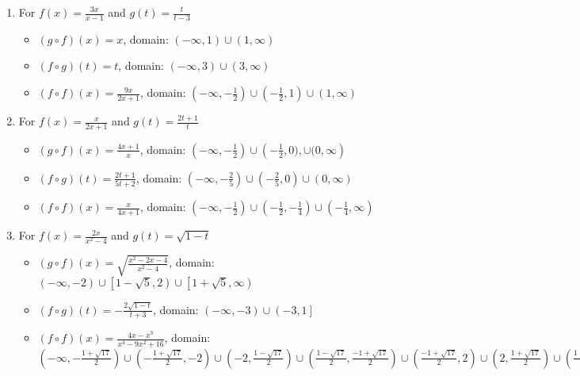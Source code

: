 \begin{enumerate}
\begin{itemize}
\end{itemize}


\item For   $f(x) = \frac{3x}{x-1}$ and $g(t) =\frac{t}{t-3}$

\begin{itemize}

\item  $(g \circ f)(x) =x$, domain: $\left(-\infty, 1\right) \cup (1, \infty)$

\item  $(f \circ g)(t) =t$, domain:  $\left(-\infty, 3\right) \cup (3,\infty)$

\item  $(f \circ f)(x) = \frac{9x}{2x+1}$, domain: $\left(-\infty, -\frac{1}{2}\right) \cup \left(-\frac{1}{2}, 1 \right) \cup \left(1,\infty \right)$

\end{itemize}


\item For    $f(x) = \frac{x}{2x+1}$ and $g(t) = \frac{2t+1}{t}$

\begin{itemize}

\item  $(g \circ f)(x) = \frac{4x+1}{x}$, domain: $\left(-\infty, -\frac{1}{2}\right) \cup \left(-\frac{1}{2}, 0), \cup (0, \infty\right)$

\item  $(f \circ g)(t) = \frac{2t+1}{5t+2}$, domain:  $\left(-\infty, -\frac{2}{5}\right) \cup \left(-\frac{2}{5}, 0\right) \cup (0,\infty)$

\item  $(f \circ f)(x) = \frac{x}{4x+1}$, domain: $\left(-\infty, -\frac{1}{2}\right) \cup \left(-\frac{1}{2}, -\frac{1}{4} \right) \cup \left(-\frac{1}{4},\infty\right)$

\end{itemize}


\item For  $f(x) = \frac{2x}{x^2-4}$ and $g(t) =\sqrt{1-t}$ 

\begin{itemize}

\item  $(g \circ f)(x) =\sqrt{\frac{x^2-2x-4}{x^2-4}}$, domain: $\left(-\infty, -2\right) \cup \left[1-\sqrt{5}, 2\right) \cup \left[1+\sqrt{5}, \infty\right)$

\item  $(f \circ g)(t) = -\frac{2\sqrt{1-t}}{t+3}$, domain: $\left(-\infty, -3\right) \cup \left(-3, 1\right]$

\item  $(f \circ f)(x) = \frac{4x-x^3}{x^4-9x^2+16}$, domain: $\left(-\infty, -\frac{1+\sqrt{17}}{2}\right) \cup \left(-\frac{1+\sqrt{17}}{2}, -2\right) \cup \left(-2, \frac{1-\sqrt{17}}{2}\right) \cup \left(\frac{1-\sqrt{17}}{2}, \frac{-1+\sqrt{17}}{2}\right) \cup \left(\frac{-1+\sqrt{17}}{2}, 2\right) \cup \left(2, \frac{1+\sqrt{17}}{2} \right) \cup \left(\frac{1+\sqrt{17}}{2}, \infty\right)$

\end{itemize}
\setcounter{HW}{\value{enumi}}
\end{enumerate}


